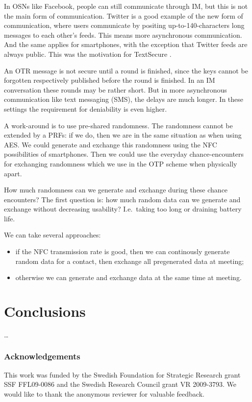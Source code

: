 In \acp{OSN} like Facebook, people can still communicate through \ac{IM}, but 
this is not the main form of communication.
Twitter is a good example of the new form of communication, where users 
communicate by positing up-to-140-characters long messages to each other's 
feeds.
This means more asynchronous communication.
And the same applies for smartphones, with the exception that Twitter feeds are 
always public.
This was the motivation for TextSecure \cite{TSasynch}.

An \ac{OTR} message is not secure until a round is finished, since the keys 
cannot be forgotten respectively published before the round is finished.
In an \ac{IM} conversation these rounds may be rather short.
But in more asynchronous communication like text messaging (SMS), the delays 
are much longer.
In these settings the requirement for deniability is even higher.

A work-around is to use pre-shared randomness.
The randomness cannot be extended by a \acp{PRF}: if we do, then we are in the 
same situation as when using AES.
We could generate and exchange this randomness using the \ac{NFC} possibilities 
of smartphones.
Then we could use the everyday chance-encounters for exchanging randomness 
which we use in the \ac{OTP} scheme when physically apart.

How much randomness can we generate and exchange during these chance 
encounters?
The first question is: how much random data can we generate and exchange 
without decreasing usability?
I.e.~taking too long or draining battery life.

We can take several approaches:
\begin{itemize}
  \item if the \ac{NFC} transmission rate is good, then we can continously 
    generate random data for a contact, then exchange all pregenerated data at 
    meeting;
  \item otherwise we can generate and exchange data at the same time at 
    meeting.
\end{itemize}


\section{Conclusions}

\dots


\subsubsection*{Acknowledgements}

This work was funded by the Swedish Foundation for Strategic Research grant SSF 
FFL09-0086 and the Swedish Research Council grant VR 2009-3793.
We would like to thank the anonymous reviewer for valuable feedback.


\printbibliography
